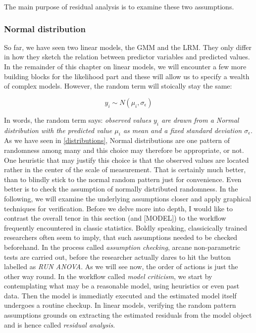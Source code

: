 \documentclass[]{svmono}
\begin{document}
The main purpose of residual analysis is to examine these two
assumptions.

\subsubsection{Normal distribution}\label{resid_normality}

So far, we have seen two linear models, the GMM and the LRM. They only
differ in how they sketch the relation between predictor variables and
predicted values. In the remainder of this chapter on linear models, we
will encounter a few more building blocks for the likelihood part and
these will allow us to specify a wealth of complex models. However, the
random term will stoically stay the same:

\[y_i \sim N(\mu_i, \sigma_\epsilon)\]

In words, the random term says: \emph{observed values \(y_i\) are drawn
from a Normal distribution with the predicted value \(\mu_i\) as mean
and a fixed standard deviation \(\sigma_\epsilon\)}. As we have seen in
\ref{distributions}, Normal distributions are one pattern of randomness
among many and this choice may therefore be appropriate, or not. One
heuristic that may justify this choice is that the observed values are
located rather in the center of the scale of measurement. That is
certainly much better, than to blindly stick to the normal random
pattern just for convenience. Even better is to check the assumption of
normally distributed randomness. In the following, we will examine the
underlying assumptions closer and apply graphical techniques for
verification. Before we delve more into depth, I would like to contrast
the overall tenor in this section (and {[}MODEL{]}) to the workflow
frequently encountered in classic statistics. Boldly speaking,
classicically trained researchers often seem to imply, that such
assumptions needed to be checked beforehand. In the process called
\emph{assumption checking}, arcane non-parametric tests are carried out,
before the researcher actually dares to hit the button labelled as
\emph{RUN ANOVA}. As we will see now, the order of actions is just the
other way round. In the workflow called \emph{model criticism}, we start
by contemplating what may be a reasonable model, using heuristics or
even past data. Then the model is immediatly executed and the estimated
model itself undergoes a routine checkup. In linear models, verifying
the random pattern assumptions grounds on extracting the estimated
residuals from the model object and is hence called \emph{residual
analysis}.
\end{document}
